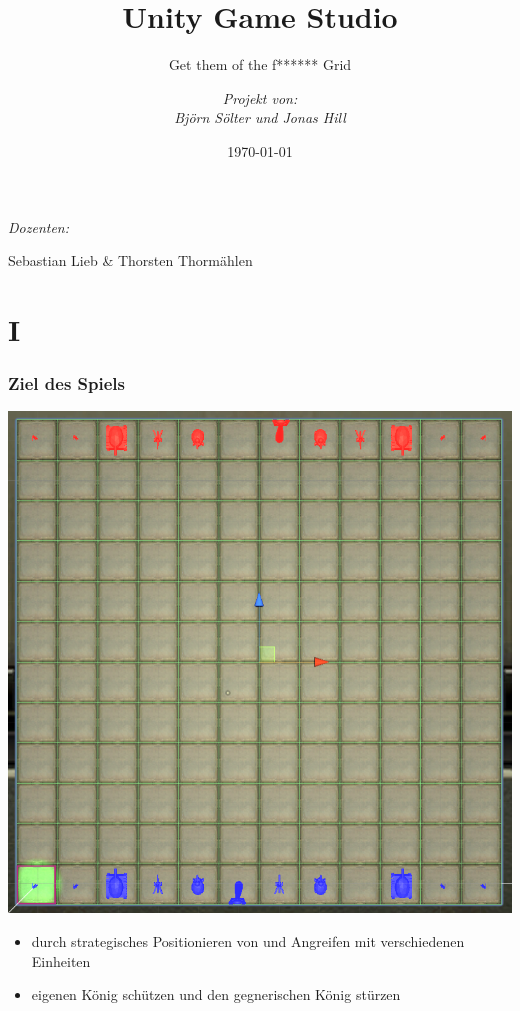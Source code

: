 ﻿\documentclass{beamer}
\author{\itshape Projekt von: \\ Björn Sölter und Jonas Hill}
\title{Unity Game Studio}
\subtitle{Get them of the f****** Grid}
\date{\today}
\begin{document}
\begin{frame}[plain]
\maketitle
\small
{\centering\itshape Dozenten:\par}
Sebastian Lieb \& Thorsten Thormählen
\end{frame}

\clearpage

\section{I}
\begin{frame} %
  \frametitle{Ziel des Spiels} %
	
	\begin{minipage}[]{0.45\textwidth}
		\includegraphics[width=\textwidth]{Abbildungen/GameTop.PNG}
	\end{minipage}
	\begin{minipage}[]{0.45\textwidth}
		\begin{itemize}
			\item durch strategisches Positionieren von und Angreifen mit verschiedenen Einheiten
			\item eigenen König schützen und den gegnerischen König stürzen
		\end{itemize}
	\end{minipage}
	
\end{frame}
\end{document}
